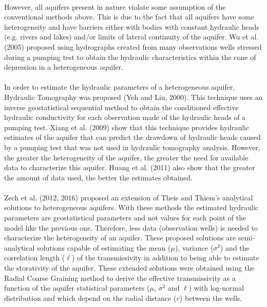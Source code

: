 \documentclass[11pt, a4paper]{article}
\begin{document}
    \paragraph{} %
    However, all aquifers present in nature violate some assumption of the conventional methods above. This is due to the fact that all aquifers have some heterogeneity and have barriers either with bodies with constant hydraulic heads (e.g. rivers and lakes) and/or limits of lateral continuity of the aquifer. Wu et al. (2005) proposed using hydrographs created from many observations wells stressed during a pumping test to obtain the hydraulic characteristics within the cone of depression in a heterogeneous aquifer.
    \paragraph{} %
    In order to estimate the hydraulic parameters of a heterogeneous aquifer, Hydraulic Tomography was proposed (Yeh and Liu, 2000). This technique uses an inverse geostatistical sequential method to obtain the conditioned effective hydraulic conductivity for each observation made of the hydraulic heads of a pumping test. Xiang et al. (2009) show that this technique provides hydraulic estimates of the aquifer that can predict the drawdown of hydraulic heads caused by a pumping test that was not used in hydraulic tomography analysis. However, the greater the heterogeneity of the aquifer, the greater the need for available data to characterize this aquifer. Huang et al. (2011) also show that the greater the amount of data used, the better the estimates obtained.
    \paragraph{} %
    Zech et al. (2012, 2016) proposed an extension of Theis and Thiem's analytical solutions to heterogeneous aquifers. With these methods the estimated hydraulic parameters are geostatistical parameters and not values for each point of the model like the previous one. Therefore, less data (observation wells) is needed to characterize the heterogeneity of an aquifer. These proposed solutions are semi-analytical solutions capable of estimating the mean ($\mu$), variance ($\sigma ^2$) and the correlation length ($\ell$) of the transmissivity in addition to being able to estimate the storativity of the aquifer. These extended solutions were obtained using the Radial Coarse Graining method to derive the effective transmissivity as a function of the aquifer statistical parameters ($\mu$, $\sigma ^2$ and $\ell$) with log-normal distribution and which depend on the radial distance ($r$) between the wells.
\end{document}
